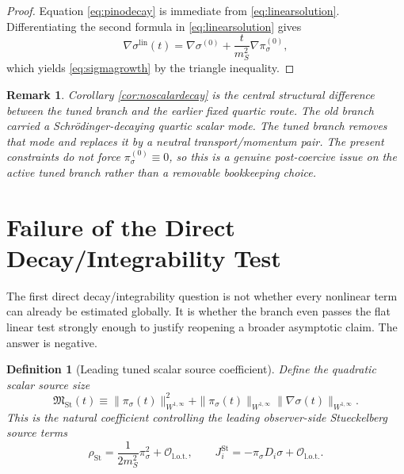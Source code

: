 \documentclass[11pt]{article}
\newtheorem{definition}{Definition}
\newtheorem{remark}{Remark}
\begin{document}
\begin{proof}
Equation \eqref{eq:pinodecay} is immediate from \eqref{eq:linearsolution}. Differentiating the second formula in \eqref{eq:linearsolution} gives
\[
\nabla\sigma^{\mathrm{lin}}(t)
=
\nabla\sigma^{(0)}
+\frac{t}{m_S^2}\nabla\pi_\sigma^{(0)},
\]
which yields \eqref{eq:sigmagrowth} by the triangle inequality.
\end{proof}

\begin{remark}
Corollary \ref{cor:noscalardecay} is the central structural difference between the tuned branch and the earlier fixed quartic route. The old branch carried a Schr\"odinger-decaying quartic scalar mode. The tuned branch removes that mode and replaces it by a neutral transport/momentum pair. The present constraints do not force \(\pi_\sigma^{(0)}\equiv 0\), so this is a genuine post-coercive issue on the active tuned branch rather than a removable bookkeeping choice.
\end{remark}

\section{Failure of the Direct Decay/Integrability Test}

The first direct decay/integrability question is not whether every nonlinear term can already be estimated globally. It is whether the branch even passes the flat linear test strongly enough to justify reopening a broader asymptotic claim. The answer is negative.

\begin{definition}[Leading tuned scalar source coefficient]
\label{def:MSt}
Define the quadratic scalar source size
\begin{equation}
\mathfrak M_{\mathrm{St}}(t)
\equiv
\|\pi_\sigma(t)\|_{W^{1,\infty}}^2
+ \|\pi_\sigma(t)\|_{W^{1,\infty}}\|\nabla\sigma(t)\|_{W^{1,\infty}}.
\label{eq:MSt}
\end{equation}
This is the natural coefficient controlling the leading observer-side Stueckelberg source terms
\begin{equation}
\rho_{\mathrm{St}}
=
\frac{1}{2m_S^2}\pi_\sigma^2+\mathcal O_{\mathrm{l.o.t.}},
\qquad
J_i^{\mathrm{St}}
=
-\pi_\sigma D_i\sigma+\mathcal O_{\mathrm{l.o.t.}}.
\label{eq:ststress}
\end{equation}
\end{definition}
\end{document}
